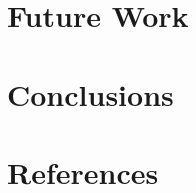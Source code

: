 \documentclass[10pt, conference, compsocconf]{IEEEtran}
\begin{document}
\section{Future Work}
\label{sec:future}

\section{Conclusions}
\label{sec:conclusion}

\section{References}
\label{sec:references}



\end{document}
